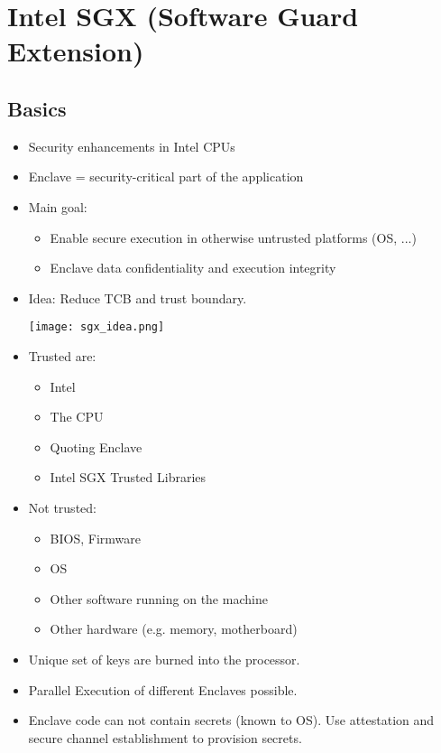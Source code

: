 
\section{Intel SGX (Software Guard Extension)}
\subsection{Basics}
\begin{itemize}
  \item Security enhancements in Intel CPUs
  \item Enclave = security-critical part of the application
  \item Main goal:
    \begin{itemize}
      \item Enable secure execution in otherwise untrusted platforms (OS, ...)
      \item Enclave data confidentiality and execution integrity
    \end{itemize}
  \item Idea: Reduce TCB and trust boundary.
    \begin{center}
      \texttt{[image: sgx\_idea.png]}
    \end{center}
  \item Trusted are:
    \begin{itemize}
      \item Intel
      \item The CPU
      \item Quoting Enclave
      \item Intel SGX Trusted Libraries
    \end{itemize}
  \item Not trusted:
    \begin{itemize}
      \item BIOS, Firmware
      \item OS
      \item Other software running on the machine
      \item Other hardware (e.g. memory, motherboard)
    \end{itemize}
  \item Unique set of keys are burned into the processor.
  \item Parallel Execution of different Enclaves possible.
  \item Enclave code can not contain secrets (known to OS). Use attestation and secure channel establishment to provision secrets.
\end{itemize}

